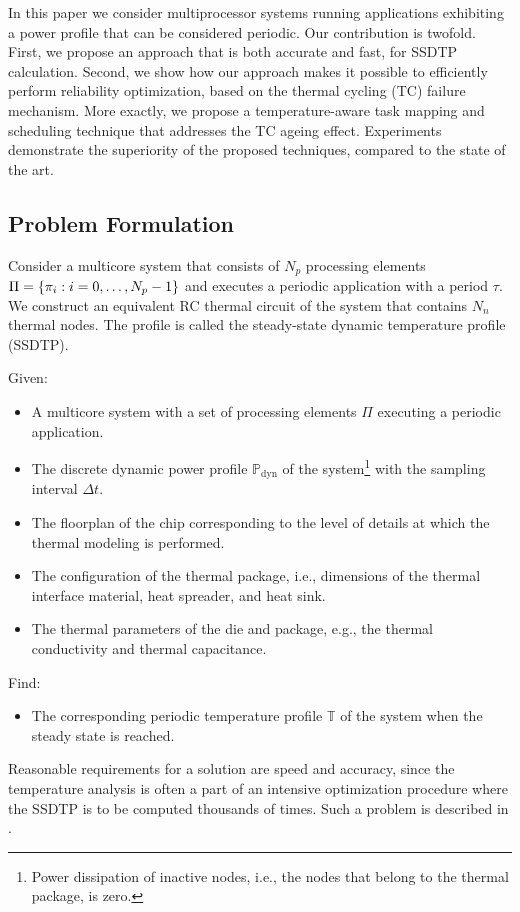 In this paper we consider multiprocessor systems running applications exhibiting
a power profile that can be considered periodic. Our contribution is twofold.
First, we propose an approach that is both accurate and fast, for SSDTP
calculation. Second, we show how our approach makes it possible to efficiently
perform reliability optimization, based on the thermal cycling (TC) failure
mechanism. More exactly, we propose a temperature-aware task mapping and
scheduling technique that addresses the TC ageing effect. Experiments
demonstrate the superiority of the proposed techniques, compared to the state of
the art.

\subsection{Problem Formulation}

Consider a multicore system that consists of $N_p$ processing elements $\Pi = \{
\pi_i: i = 0, \dots, N_p - 1 \}$ and executes a periodic application with a
period $\tau$. We construct an equivalent RC thermal circuit of the system that
contains $N_n$ thermal nodes.
The profile is called the steady-state dynamic temperature profile (SSDTP).

Given:
\begin{itemize}

\item A multicore system with a set of processing elements $\Pi$ executing a
periodic application.

\item The discrete dynamic power profile $\mathbb{P}_\text{dyn}$ of the
system\footnote{Power dissipation of inactive nodes, i.e., the nodes that belong
to the thermal package, is zero.} with the sampling interval $\Delta t$.

\item The floorplan of the chip corresponding to the level of details at which
the thermal modeling is performed.

\item The configuration of the thermal package, i.e., dimensions of the thermal
interface material, heat spreader, and heat sink.

\item The thermal parameters of the die and package, e.g., the thermal
conductivity and thermal capacitance.

\end{itemize}

Find:
\begin{itemize}

\item The corresponding periodic temperature profile $\mathbb{T}$ of the system
when the steady state is reached.

\end{itemize}
Reasonable requirements for a solution are speed and accuracy, since the
temperature analysis is often a part of an intensive optimization procedure
where the SSDTP is to be computed thousands of times. Such a problem is
described in .

